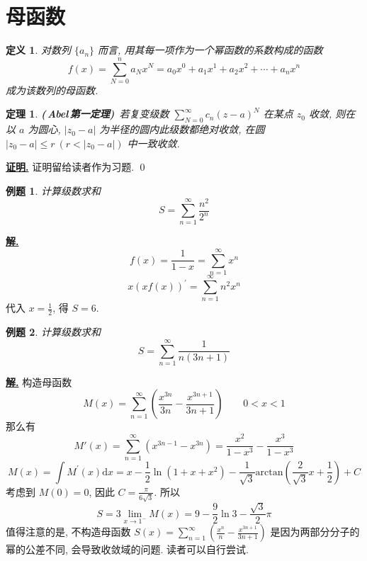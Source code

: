 \documentclass[10pt,a4paper]{book}
\theoremstyle{thmstyle} %
\newtheorem{theorem}{定理}[chapter]
\theoremstyle{defstyle} %
\newtheorem{definition}{定义}[chapter]
\theoremstyle{prostyle} %
\newtheorem{example}{例题}[chapter]
\renewenvironment{proof}[1][证明]{\par{\kaishu \uline{\textbf{#1.}}} \;\fangsong}{\qed\par}
\newenvironment{solution}{\par\underline{\textbf{解.}} \;\kaishu}{\par}
\begin{document}
		\section{母函数}
		\begin{definition}
			对数列 $\{a_n\}$ 而言, 用其每一项作为一个幂函数的系数构成的函数
			$$
			f\left( x \right) =\sum_{N=0}^n{a_Nx^N}=a_0x^0+a_1x^1+a_2x^2+\cdots +a_nx^n
			$$
			成为该数列的母函数.
		\end{definition}
		\begin{theorem}
			\textbf{(\,Abel\,第一定理)}\ 若复变级数 $\displaystyle\sum_{N=0}^{\infty}c_n(z-a)^N$ 在某点 $z_0$ 收敛, 则在以 $a$ 为圆心, $|z_0-a|$ 为半径的圆内此级数都绝对收敛, 在圆 $|z_0-a|\leqslant r\ (r<|z_0-a|)$ 中一致收敛.
		\end{theorem}
		\begin{proof}
			证明留给读者作为习题.
		\end{proof}
		\begin{example}
			计算级数求和
			$$
			S=\sum\limits_{n=1}^{\infty}\frac{n^2}{2^n}
			$$
			
		\end{example}
		\begin{solution}
			$$
			f\left( x \right) =\frac{1}{1-x}=\sum_{n=1}^{\infty}{x^n}
			$$
			$$
			x\left( xf\left( x \right) \right) ^{\prime}=\sum_{n=1}^{\infty}{n^2x^n}
			$$
			代入 $\displaystyle x=\frac{1}{2}$, 得 $S=6$.
		\end{solution}
		\begin{example}
			计算级数求和
			$$
			S=\sum_{n=1}^{\infty}{\frac{1}{n\left( 3n+1 \right)}}
			$$
		\end{example}
		\begin{solution}
			构造母函数
			$$
			M\left( x \right) =\sum_{n=1}^{\infty}{\left( \frac{x^{3n}}{3n}-\frac{x^{3n+1}}{3n+1} \right)}\quad\quad 0<x<1
			$$
			那么有
			$$
			M'\left( x \right) =\sum_{n=1}^{\infty}{\left( x^{3n-1}-x^{3n} \right)}=\frac{x^2}{1-x^3}-\frac{x^3}{1-x^3}
			$$
			$$
			M\left( x \right) =\int{M^{\prime}\left( x \right) \mathrm{d}x=x-\frac{1}{2}\ln \left( 1+x+x^2 \right) -\frac{1}{\sqrt{3}}\mathrm{arctan} \left( \frac{2}{\sqrt{3}}x+\frac{1}{2} \right) +C}
			$$
			考虑到 $M(0)=0$, 因此 $\displaystyle C=\frac{\pi}{6\sqrt{3}}$. 所以
			$$
			S=3\lim_{x\to 1^-}M(x)=9-\frac{9}{2}\ln3-\frac{\sqrt{3}}{2}\pi
			$$
			值得注意的是, 不构造母函数 $S(x)=\displaystyle\sum_{n=1}^{\infty}(\frac{x^{n}}{n}-\frac{x^{3n+1}}{3n+1})$ 是因为两部分分子的幂的公差不同, 会导致收敛域的问题. 读者可以自行尝试.
		\end{solution}
\end{document}
